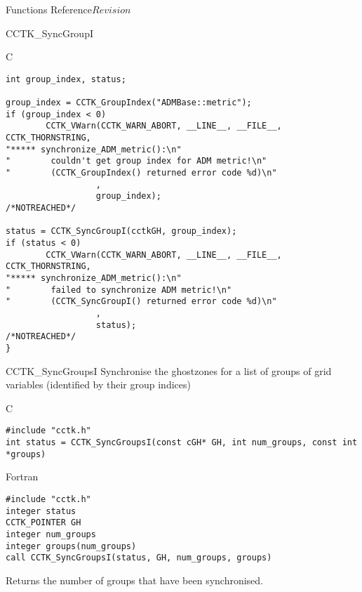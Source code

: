 \begin{cactuspart}{ Functions Reference}{}{$Revision$}
\begin{FunctionDescription}{CCTK\_SyncGroupI}
\begin{ExampleSection}
\begin{Example}{C}
\begin{verbatim}
int group_index, status;

group_index = CCTK_GroupIndex("ADMBase::metric");
if (group_index < 0)
        CCTK_VWarn(CCTK_WARN_ABORT, __LINE__, __FILE__, CCTK_THORNSTRING,
"***** synchronize_ADM_metric():\n"
"        couldn't get group index for ADM metric!\n"
"        (CCTK_GroupIndex() returned error code %d)\n"
                  ,
                  group_index);                            /*NOTREACHED*/

status = CCTK_SyncGroupI(cctkGH, group_index);
if (status < 0)
        CCTK_VWarn(CCTK_WARN_ABORT, __LINE__, __FILE__, CCTK_THORNSTRING,
"***** synchronize_ADM_metric():\n"
"        failed to synchronize ADM metric!\n"
"        (CCTK_SyncGroupI() returned error code %d)\n"
                  ,
                  status);                                 /*NOTREACHED*/
}
\end{verbatim}
\end{Example}
\end{ExampleSection}
\end{FunctionDescription}



\begin{FunctionDescription}{CCTK\_SyncGroupsI}
\label{CCTK-SyncGroupsI}
Synchronise the ghostzones for a list of groups of grid variables
(identified by their group indices)

\begin{SynopsisSection}
\begin{Synopsis}{C}
\begin{verbatim}
#include "cctk.h"
int status = CCTK_SyncGroupsI(const cGH* GH, int num_groups, const int *groups)
\end{verbatim}
\end{Synopsis}
\begin{Synopsis}{Fortran}
\begin{verbatim}
#include "cctk.h"
integer status
CCTK_POINTER GH
integer num_groups
integer groups(num_groups)
call CCTK_SyncGroupsI(status, GH, num_groups, groups)
\end{verbatim}
\end{Synopsis}
\end{SynopsisSection}

\begin{ResultSection}
\begin{Result}{0}
Returns the number of groups that have been synchronised.
\end{Result}
\end{ResultSection}


\end{FunctionDescription}
\end{cactuspart}
